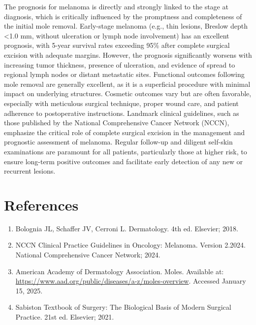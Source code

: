 The prognosis for melanoma is directly and strongly linked to the stage at diagnosis, which is critically influenced by the promptness and completeness of the initial mole removal. Early-stage melanoma (e.g., thin lesions, Breslow depth <1.0 mm, without ulceration or lymph node involvement) has an excellent prognosis, with 5-year survival rates exceeding 95\% after complete surgical excision with adequate margins. However, the prognosis significantly worsens with increasing tumor thickness, presence of ulceration, and evidence of spread to regional lymph nodes or distant metastatic sites. Functional outcomes following mole removal are generally excellent, as it is a superficial procedure with minimal impact on underlying structures. Cosmetic outcomes vary but are often favorable, especially with meticulous surgical technique, proper wound care, and patient adherence to postoperative instructions. Landmark clinical guidelines, such as those published by the National Comprehensive Cancer Network (NCCN), emphasize the critical role of complete surgical excision in the management and prognostic assessment of melanoma. Regular follow-up and diligent self-skin examinations are paramount for all patients, particularly those at higher risk, to ensure long-term positive outcomes and facilitate early detection of any new or recurrent lesions.

\section*{References}
\begin{enumerate}
  \item Bolognia JL, Schaffer JV, Cerroni L. Dermatology. 4th ed. Elsevier; 2018.
  
  \item NCCN Clinical Practice Guidelines in Oncology: Melanoma. Version 2.2024. National Comprehensive Cancer Network; 2024.
  
  \item American Academy of Dermatology Association. Moles. Available at: \url{https://www.aad.org/public/diseases/a-z/moles-overview}. Accessed January 15, 2025.
  
  \item Sabiston Textbook of Surgery: The Biological Basis of Modern Surgical Practice. 21st ed. Elsevier; 2021.
\end{enumerate}

\clearpage
